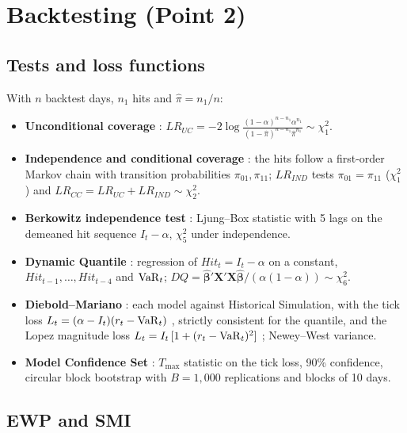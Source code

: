 \section{Backtesting (Point 2)}\label{sec:backtesting}

\subsection{Tests and loss functions}
With $n$ backtest days, $n_1$ hits and $\hat\pi = n_1/n$:
\begin{itemize}
  \item \textbf{Unconditional coverage} \citep{kupiec1995}:
        $LR_{UC} = -2\log\frac{(1-\alpha)^{n-n_1}\alpha^{n_1}}{(1-\hat\pi)^{n-n_1}\hat\pi^{n_1}} \sim \chi^2_1$.
  \item \textbf{Independence and conditional coverage} \citep{christoffersen1998}: the hits follow a first-order Markov
        chain with transition probabilities $\pi_{01},\pi_{11}$; $LR_{IND}$ tests $\pi_{01}=\pi_{11}$ ($\chi^2_1$) and
        $LR_{CC} = LR_{UC} + LR_{IND} \sim \chi^2_2$.
  \item \textbf{Berkowitz independence test} \citep{berkowitz2011}: Ljung--Box statistic with 5 lags on the
        demeaned hit sequence $I_t - \alpha$, $\chi^2_5$ under independence.
  \item \textbf{Dynamic Quantile} \citep{engle2004}: regression of $Hit_t = I_t-\alpha$ on a constant, $Hit_{t-1},\dots,Hit_{t-4}$
        and $\mathrm{VaR}_t$; $DQ = \hat{\bm\beta}'\bm X'\bm X\hat{\bm\beta}/(\alpha(1-\alpha)) \sim \chi^2_6$.
  \item \textbf{Diebold--Mariano} \citep{diebold1995}: each model against Historical Simulation, with the tick loss
        $L_t = (\alpha - I_t)(r_t - \mathrm{VaR}_t)$ \citep{gonzalez2004}, strictly consistent for the quantile, and the Lopez
        magnitude loss $L_t = I_t\,[1 + (r_t-\mathrm{VaR}_t)^2]$ \citep{lopez1999}; Newey--West variance.
  \item \textbf{Model Confidence Set} \citep{hansen2011}: $T_{\max}$ statistic on the tick loss, 90\% confidence,
        circular block bootstrap with $B = 1{,}000$ replications and blocks of 10 days.
\end{itemize}

\subsection{EWP and SMI}

